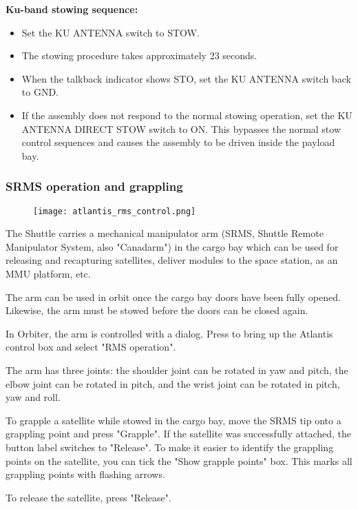 \documentclass[Orbiter User Manual.tex]{subfiles}
\begin{document}
\noindent
\textbf{Ku-band stowing sequence:}
\begin{itemize}
\item Set the KU ANTENNA switch to STOW.
\item The stowing procedure takes approximately 23 seconds.
\item When the talkback indicator shows STO, set the KU ANTENNA switch back to GND.
\item If the assembly does not respond to the normal stowing operation, set the KU ANTENNA DIRECT STOW switch to ON. This bypasses the normal stow control sequences and causes the assembly to be driven inside the payload bay.
\end{itemize}

\subsubsection{SRMS operation and grappling}
\label{sssec:atlantis_rms}

\begin{figure}[H]
  \centering
  \texttt{[image: atlantis\_rms\_control.png]}
\end{figure}

\noindent
The Shuttle carries a mechanical manipulator arm (SRMS, Shuttle Remote Manipulator System, also "Canadarm") in the cargo bay which can be used for releasing and recapturing satellites, deliver modules to the space station, as an MMU platform, etc.

The arm can be used in orbit once the cargo bay doors have been fully opened. Likewise, the arm must be stowed before the doors can be closed again.

In Orbiter, the arm is controlled with a dialog. Press  to bring up the Atlantis control box and select "RMS operation".

The arm has three joints: the shoulder joint can be rotated in yaw and pitch, the elbow joint can be rotated in pitch, and the wrist joint can be rotated in pitch, yaw and roll.

To grapple a satellite while stowed in the cargo bay, move the SRMS tip onto a grappling point and press "Grapple". If the satellite was successfully attached, the button label switches to "Release". To make it easier to identify the grappling points on the satellite, you can tick the "Show grapple points" box. This marks all grappling points with flashing arrows.

To release the satellite, press "Release".
\end{document}

